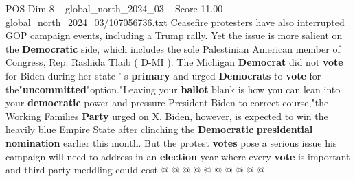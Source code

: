 \begin{textsample}{POS Dim 8 – global\_north\_2024\_03 – Score 11.00 – global\_north\_2024\_03/107056736.txt}
Ceasefire protesters have also interrupted GOP campaign events, including a Trump rally.
Yet the issue is more salient on the \textbf{Democratic} side, which includes the sole Palestinian American member of Congress, Rep.
Rashida Tlaib ( D-MI ).
The Michigan \textbf{Democrat} did not \textbf{vote} for Biden during her state ' s \textbf{primary} and urged \textbf{Democrats} to \textbf{vote} for the"\textbf{uncommitted}"option."Leaving your \textbf{ballot} blank is how you can lean into your \textbf{democratic} power and pressure President Biden to correct course,"the Working Families \textbf{Party} urged on X.
Biden, however, is expected to win the heavily blue Empire State after clinching the \textbf{Democratic} \textbf{presidential} \textbf{nomination} earlier this month.
But the protest \textbf{votes} pose a serious issue his campaign will need to address in an \textbf{election} year where every \textbf{vote} is important and third-party meddling could cost @ @ @ @ @ @ @ @ @ @

\end{textsample}
